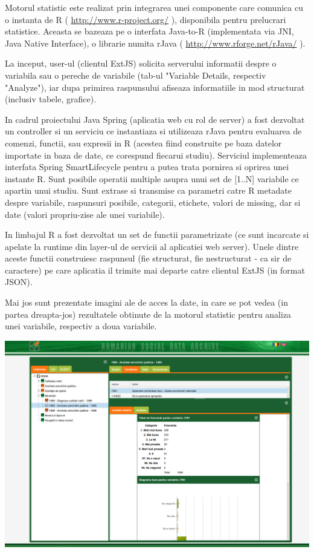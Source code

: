 Motorul statistic este realizat prin integrarea unei componente care comunica cu o instanta de R 
( \url{http://www.r-project.org/} ), 
disponibila pentru prelucrari statistice.
Aceasta se bazeaza pe o interfata Java-to-R 
(implementata via JNI, Java Native Interface), 
o librarie numita rJava ( \url{http://www.rforge.net/rJava/} ).

La inceput, user-ul (clientul ExtJS) solicita serverului informatii despre o variabila sau o pereche de variabile (tab-ul "Variable Details, respectiv "Analyze"), 
iar dupa primirea raspunsului afiseaza informatiile in mod structurat (inclusiv tabele, grafice).

In cadrul proiectului Java Spring (aplicatia web cu rol de server) 
a fost dezvoltat un controller si un serviciu ce instantiaza si utilizeaza rJava 
pentru evaluarea de comenzi, functii, sau expresii in R 
(acestea fiind construite pe baza datelor importate in baza de date, ce corespund fiecarui studiu). 
Serviciul implementeaza interfata Spring SmartLifecycle pentru a putea trata pornirea si oprirea unei instante R. 
Sunt posibile operatii multiple asupra unui set de [1..N] variabile ce apartin unui studiu.
Sunt extrase si transmise ca parametri catre R metadate despre variabile, raspunsuri posibile, categorii, etichete, valori de missing, 
dar si date (valori propriu-zise ale unei variabile).

In limbajul R a fost dezvoltat un set de functii parametrizate 
(ce sunt incarcate si apelate la runtime din layer-ul de servicii al aplicatiei web server).
Unele dintre aceste functii construiesc raspunsul (fie structurat, fie nestructurat - ca sir de caractere) 
pe care aplicatia il trimite mai departe catre clientul ExtJS (in format JSON).

Mai jos sunt prezentate imagini ale de acces la date, in care se pot vedea (in partea dreapta-jos) 
rezultatele obtinute de la motorul statistic pentru analiza unei variabile, respectiv a doua variabile.

\medskip
\includegraphics[width=\textwidth]{img/Screenshot-statistics}


